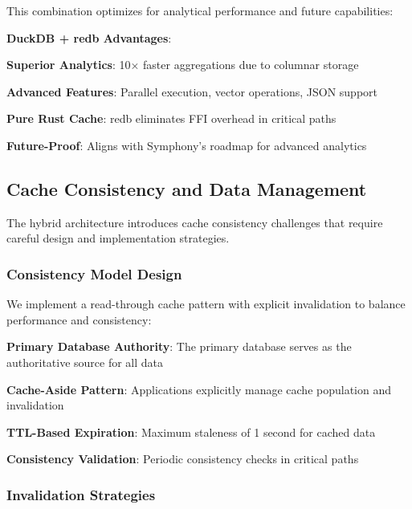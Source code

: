 This combination optimizes for analytical performance and future capabilities:

\begin{successbox}
\textbf{DuckDB + redb Advantages}:
\begin{compactlist}
    \item \textbf{Superior Analytics}: 10× faster aggregations due to columnar storage
    \item \textbf{Advanced Features}: Parallel execution, vector operations, JSON support
    \item \textbf{Pure Rust Cache}: redb eliminates FFI overhead in critical paths
    \item \textbf{Future-Proof}: Aligns with Symphony's roadmap for advanced analytics
\end{compactlist}
\end{successbox}

\subsection*{Cache Consistency and Data Management}

The hybrid architecture introduces cache consistency challenges that require careful design and implementation strategies.

\subsubsection*{Consistency Model Design}

We implement a read-through cache pattern with explicit invalidation to balance performance and consistency:

\begin{expandedlist}
    \item \textbf{Primary Database Authority}: The primary database serves as the authoritative source for all data
    \item \textbf{Cache-Aside Pattern}: Applications explicitly manage cache population and invalidation
    \item \textbf{TTL-Based Expiration}: Maximum staleness of 1 second for cached data
    \item \textbf{Consistency Validation}: Periodic consistency checks in critical paths
\end{expandedlist}

\subsubsection*{Invalidation Strategies}

